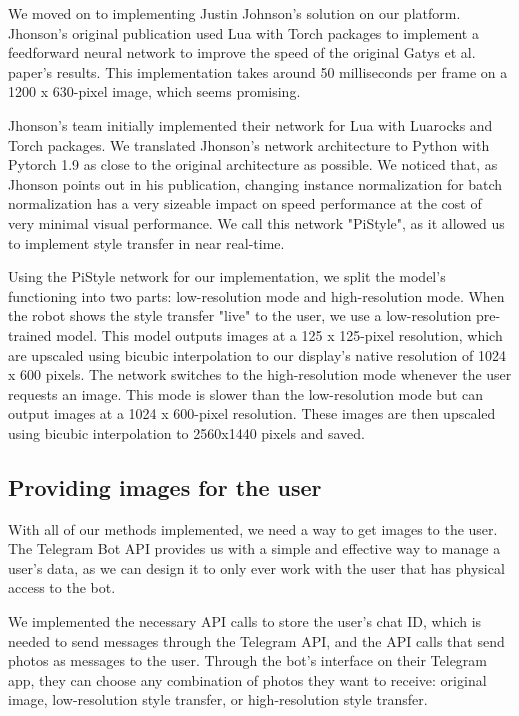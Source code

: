 We moved on to implementing Justin Johnson's solution on our platform. Jhonson's original publication used Lua with Torch packages to implement a feedforward neural network to improve the speed of the original Gatys et al. paper's results. This implementation takes around 50 milliseconds per frame on a 1200 x 630-pixel image, which seems promising. 

Jhonson's team initially implemented their network for Lua with Luarocks and Torch packages. We translated Jhonson's network architecture to Python with Pytorch 1.9 as close to the original architecture as possible. We noticed that, as Jhonson points out in his publication, changing instance normalization for batch normalization has a very sizeable impact on speed performance at the cost of very minimal visual performance. We call this network "PiStyle", as it allowed us to implement style transfer in near real-time.


Using the PiStyle network for our implementation, we split the model's functioning into two parts: low-resolution mode and high-resolution mode. When the robot shows the style transfer "live" to the user, we use a low-resolution pre-trained model. This model outputs images at a 125 x 125-pixel resolution, which are upscaled using bicubic interpolation to our display's native resolution of 1024 x 600 pixels. The network switches to the high-resolution mode whenever the user requests an image. This mode is slower than the low-resolution mode but can output images at a 1024 x 600-pixel resolution. These images are then upscaled using bicubic interpolation to 2560x1440 pixels and saved.

\subsection{Providing images for the user}

With all of our methods implemented, we need a way to get images to the user. The Telegram Bot API provides us with a simple and effective way to manage a user's data, as we can design it to only ever work with the user that has physical access to the bot. 

We implemented the necessary API calls to store the user's chat ID, which is needed to send messages through the Telegram API, and the API calls that send photos as messages to the user. Through the bot's interface on their Telegram app, they can choose any combination of photos they want to receive: original image, low-resolution style transfer, or high-resolution style transfer.


